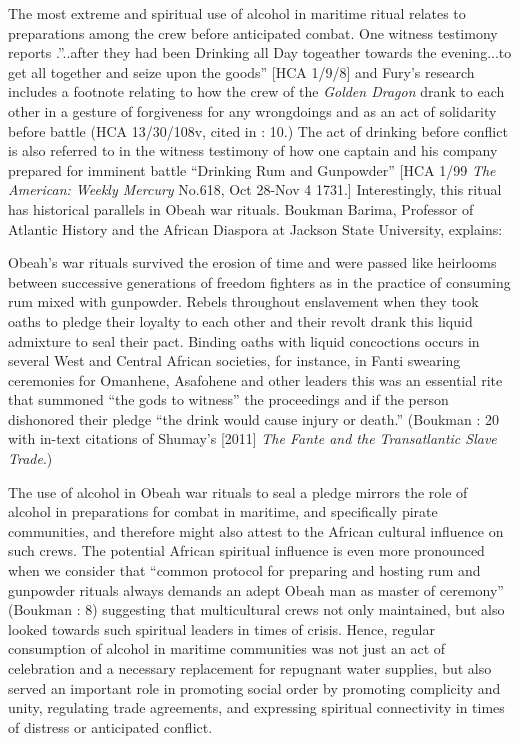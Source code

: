   The most extreme and spiritual use of alcohol in maritime ritual relates to preparations among the crew before anticipated combat. One witness testimony reports .”..after they had been Drinking all Day togeather towards the evening...to get all together and seize upon the goods” [HCA 1/9/8] and Fury’s research includes a footnote relating to how the crew of the \textit{Golden Dragon} drank to each other in a gesture of forgiveness for any wrongdoings and as an act of solidarity before battle (HCA 13/30/108v, cited in \citealt{Fury2015}: 10.) The act of drinking before conflict is also referred to in the witness testimony of how one captain and his company prepared for imminent battle “Drinking Rum and Gunpowder” [HCA 1/99 \textit{The American: Weekly Mercury} No.618, Oct 28-Nov 4 1731.] Interestingly, this ritual has historical parallels in Obeah war rituals. Boukman Barima, Professor of Atlantic History and the African Diaspora at Jackson State University, explains:

Obeah’s war rituals survived the erosion of time and were passed like heirlooms between successive generations of freedom fighters as in the practice of consuming rum mixed with gunpowder. Rebels throughout enslavement when they took oaths to pledge their loyalty to each other and their revolt drank this liquid admixture to seal their pact. Binding oaths with liquid concoctions occurs in several West and Central African societies, for instance, in Fanti swearing ceremonies for Omanhene, Asafohene and other leaders this was an essential rite that summoned “the gods to witness” the proceedings and if the person dishonored their pledge “the drink would cause injury or death.” (Boukman \citealt{Barima2016}: 20 with in-text citations of Shumay’s [2011] \textit{The Fante and the Transatlantic Slave Trade}.)

The use of alcohol in Obeah war rituals to seal a pledge mirrors the role of alcohol in preparations for combat in maritime, and specifically pirate communities, and therefore might also attest to the African cultural influence on such crews. The potential African spiritual influence is even more pronounced when we consider that “common protocol for preparing and hosting rum and gunpowder rituals always demands an adept Obeah man as master of ceremony” (Boukman \citealt{Barima2016}: 8) suggesting that multicultural crews not only maintained, but also looked towards such spiritual leaders in times of crisis. Hence, regular consumption of alcohol in maritime communities was not just an act of celebration and a necessary replacement for repugnant water supplies, but also served an important role in promoting social order by promoting complicity and unity, regulating trade agreements, and expressing spiritual connectivity in times of distress or anticipated conflict. 

